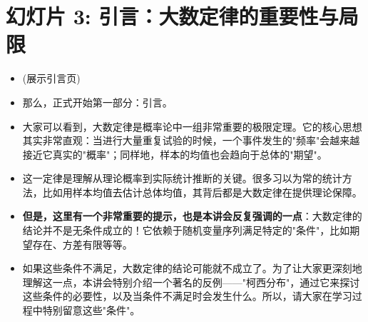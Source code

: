 \documentclass[UTF8]{article} %
\begin{document}
\section*{幻灯片 3: 引言：大数定律的重要性与局限}
\begin{itemize}
    \itemsep1em
    \item (展示引言页)
    \item 那么，正式开始第一部分：引言。
    \item 大家可以看到，大数定律是概率论中一组非常重要的极限定理。它的核心思想其实非常直观：当进行大量重复试验的时候，一个事件发生的"频率"会越来越接近它真实的"概率"；同样地，样本的均值也会趋向于总体的"期望"。
    \item 这一定律是理解从理论概率到实际统计推断的关键。很多习以为常的统计方法，比如用样本均值去估计总体均值，其背后都是大数定律在提供理论保障。
    \item \textbf{但是，这里有一个非常重要的提示，也是本讲会反复强调的一点}：大数定律的结论并不是无条件成立的！它依赖于随机变量序列满足特定的"条件"，比如期望存在、方差有限等等。
    \item 如果这些条件不满足，大数定律的结论可能就不成立了。为了让大家更深刻地理解这一点，本讲会特别介绍一个著名的反例——"柯西分布"，通过它来探讨这些条件的必要性，以及当条件不满足时会发生什么。所以，请大家在学习过程中特别留意这些"条件"。
\end{itemize}
\end{document}
